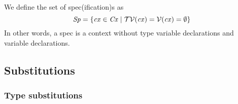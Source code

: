 We define the set of spec(ification)s as
\[
\mathit{Sp} = \{\mathit{cx}\in\mathit{Cx}\mid\mathcal{TV}(\mathit{cx})=\mathcal{V}(\mathit{cx})=\emptyset\}
\]
In other words, a spec is a context without type variable declarations and
variable declarations.



\subsection{Substitutions}

\subsubsection{Type substitutions}

